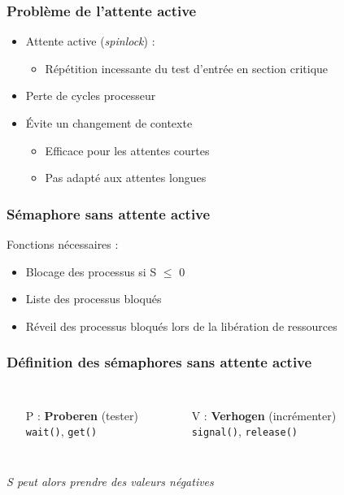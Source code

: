 \begin{frame}
\frametitle{Problème de l’attente active}
\begin{itemize}
\item Attente active (\textit{spinlock}) :
\begin{itemize}
\item Répétition incessante du test d'entrée en section critique
\end{itemize}
\item Perte de cycles processeur
\item Évite un changement de contexte
\begin{itemize}
\item Efficace pour les attentes courtes
\item Pas adapté aux attentes longues
\end{itemize}
\end{itemize}
\end{frame}

\begin{frame}
\frametitle{Sémaphore sans attente active}
Fonctions nécessaires :
\begin{itemize}
\item Blocage des processus si S $\leqslant$ 0
\item Liste des processus bloqués
\item Réveil des processus bloqués lors de la libération de ressources
\end{itemize}
\end{frame}

\begin{frame}
\frametitle{Définition des sémaphores sans attente active}
\begin{columns}
\begin{itemize}
\item[P] : \textbf{Proberen} (tester)\\ \texttt{wait()}, \texttt{get()}
\end{itemize}
\begin{small}\end{small}
\begin{itemize}
\item[V] : \textbf{Verhogen} (incrémenter)\\ \texttt{signal()}, \texttt{release()}
\end{itemize}
\begin{small}\end{small}
\end{columns}
\begin{block}{}
\begin{center}
\textit{S peut alors prendre des valeurs négatives}
\end{center}
\end{block}
\end{frame}


